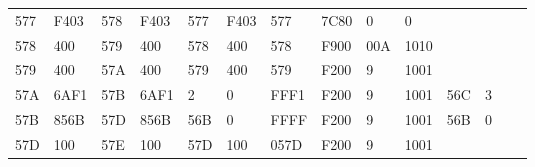 \begin{tabular}{|*{14}{l|}}
577	& F403	& 578	& F403	& 577	& F403	& 577	& 7C80	& 0 	& 0 	&   	& \\
578	& 400	& 579	& 400	& 578	& 400	& 578	& F900	& 00A	& 1010	&   	& \\
579	& 400	& 57A	& 400	& 579	& 400	& 579	& F200	& 9 	& 1001	&   	& \\
57A	& 6AF1	& 57B	& 6AF1	& 2 	& 0 	& FFF1	& F200	& 9 	& 1001	& 56C	& 3\\
57B	& 856B	& 57D	& 856B	& 56B	& 0 	& FFFF	& F200	& 9 	& 1001	& 56B	& 0\\
57D	& 100	& 57E	& 100	& 57D	& 100	& 057D	& F200	& 9 	& 1001	&   	& \\\hline


\end{tabular}